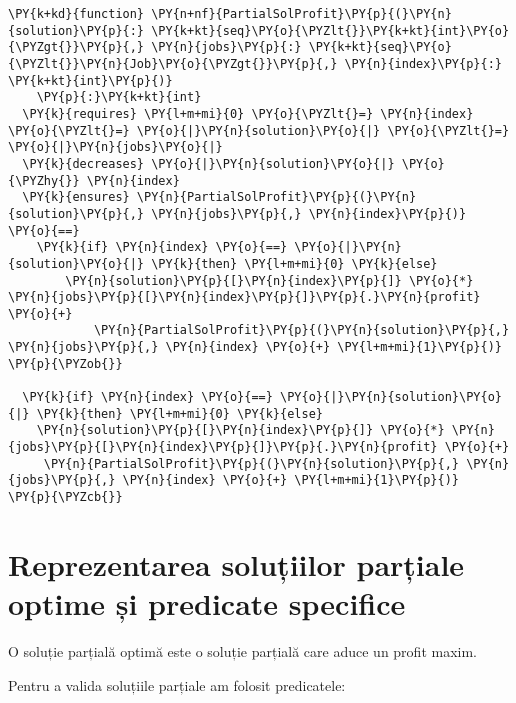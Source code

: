 \begin{Verbatim}[commandchars=\\\{\},fontsize=\footnotesize]
\PY{k+kd}{function} \PY{n+nf}{PartialSolProfit}\PY{p}{(}\PY{n}{solution}\PY{p}{:} \PY{k+kt}{seq}\PY{o}{\PYZlt{}}\PY{k+kt}{int}\PY{o}{\PYZgt{}}\PY{p}{,} \PY{n}{jobs}\PY{p}{:} \PY{k+kt}{seq}\PY{o}{\PYZlt{}}\PY{n}{Job}\PY{o}{\PYZgt{}}\PY{p}{,} \PY{n}{index}\PY{p}{:} \PY{k+kt}{int}\PY{p}{)}
    \PY{p}{:}\PY{k+kt}{int}
  \PY{k}{requires} \PY{l+m+mi}{0} \PY{o}{\PYZlt{}=} \PY{n}{index} \PY{o}{\PYZlt{}=} \PY{o}{|}\PY{n}{solution}\PY{o}{|} \PY{o}{\PYZlt{}=} \PY{o}{|}\PY{n}{jobs}\PY{o}{|}
  \PY{k}{decreases} \PY{o}{|}\PY{n}{solution}\PY{o}{|} \PY{o}{\PYZhy{}} \PY{n}{index}
  \PY{k}{ensures} \PY{n}{PartialSolProfit}\PY{p}{(}\PY{n}{solution}\PY{p}{,} \PY{n}{jobs}\PY{p}{,} \PY{n}{index}\PY{p}{)} \PY{o}{==} 
    \PY{k}{if} \PY{n}{index} \PY{o}{==} \PY{o}{|}\PY{n}{solution}\PY{o}{|} \PY{k}{then} \PY{l+m+mi}{0} \PY{k}{else}
        \PY{n}{solution}\PY{p}{[}\PY{n}{index}\PY{p}{]} \PY{o}{*} \PY{n}{jobs}\PY{p}{[}\PY{n}{index}\PY{p}{]}\PY{p}{.}\PY{n}{profit} \PY{o}{+} 
            \PY{n}{PartialSolProfit}\PY{p}{(}\PY{n}{solution}\PY{p}{,} \PY{n}{jobs}\PY{p}{,} \PY{n}{index} \PY{o}{+} \PY{l+m+mi}{1}\PY{p}{)}
\PY{p}{\PYZob{}}

  \PY{k}{if} \PY{n}{index} \PY{o}{==} \PY{o}{|}\PY{n}{solution}\PY{o}{|} \PY{k}{then} \PY{l+m+mi}{0} \PY{k}{else} 
    \PY{n}{solution}\PY{p}{[}\PY{n}{index}\PY{p}{]} \PY{o}{*} \PY{n}{jobs}\PY{p}{[}\PY{n}{index}\PY{p}{]}\PY{p}{.}\PY{n}{profit} \PY{o}{+}
     \PY{n}{PartialSolProfit}\PY{p}{(}\PY{n}{solution}\PY{p}{,} \PY{n}{jobs}\PY{p}{,} \PY{n}{index} \PY{o}{+} \PY{l+m+mi}{1}\PY{p}{)}
\PY{p}{\PYZcb{}}
\end{Verbatim}

\section{Reprezentarea soluțiilor parțiale optime și predicate specifice}

O soluție parțială optimă este o soluție parțială care aduce un profit maxim. 

Pentru a valida soluțiile parțiale am folosit predicatele: 

